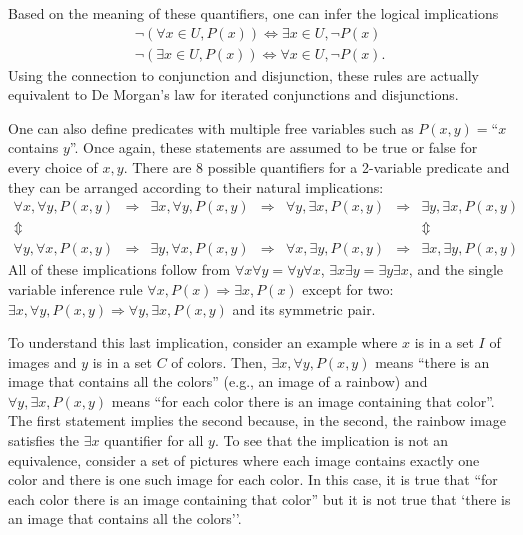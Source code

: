 Based on the meaning of these quantifiers, one can infer the logical implications
\begin{gather*}
\neg \left( \forall x \in U, P(x) \right)
\Leftrightarrow \exists x \in U, \neg P(x) \\
\neg \left( \exists x \in U,  P(x) \right)
\Leftrightarrow \forall x \in U,  \neg P(x) .
\end{gather*}
Using the connection to conjunction and disjunction, these rules are actually equivalent to De Morgan's law for iterated conjunctions and disjunctions.


One can also define predicates with multiple free variables such as $P(x,y)=$``$x$ contains $y$''.
Once again, these statements are assumed to be true or false for every choice of $x,y$.
There are 8 possible quantifiers for a 2-variable predicate and they can be arranged according to their natural implications:
\[ \begin{array}{ccccccc}
  \forall x, \forall y, P(x,y) & \Rightarrow & \exists x, \forall y, P(x,y) & \Rightarrow & \forall y, \exists x, P(x,y) & \Rightarrow & \exists y, \exists x, P(x,y) \\
  \Updownarrow &&&&&& \Updownarrow \\
  \forall y, \forall x, P(x,y) & \Rightarrow & \exists y, \forall x, P(x,y) & \Rightarrow & \forall x, \exists y, P(x,y) & \Rightarrow & \exists x, \exists y, P(x,y)
  \end{array}
\]
All of these implications follow from $\forall x \forall y = \forall y \forall x$, $\exists x \exists y = \exists y \exists x$, and the single variable inference rule $\forall x, P(x) \Rightarrow \exists x, P(x)$ except for two: $\exists x, \forall y, P(x,y) \Rightarrow \forall y, \exists x, P(x,y)$ and its symmetric pair.

To understand this last implication, consider an example where $x$ is in a set $I$ of images and $y$ is in a set $C$ of colors.
Then, $\exists x, \forall y, P(x,y)$ means ``there is an image that contains all the colors'' (e.g., an image of a rainbow) and $\forall y, \exists x, P(x,y)$ means ``for each color there is an image containing that color''.
The first statement implies the second because, in the second, the rainbow image satisfies the $\exists x$ quantifier for all $y$.
To see that the implication is not an equivalence, consider a set of pictures where each image contains exactly one color and there is one such image for each color.
In this case, it is true that ``for each color there is an image containing that color'' but it is not true that `there is an image that contains all the colors''.

